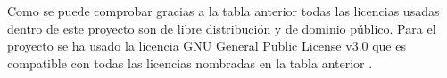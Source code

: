 Como se puede comprobar gracias a la tabla anterior todas las licencias usadas dentro de este proyecto son de libre distribución y de dominio público.
Para el proyecto se ha usado la licencia GNU General Public License v3.0 que es compatible con todas las licencias nombradas en la tabla anterior \cite{licencias}.
